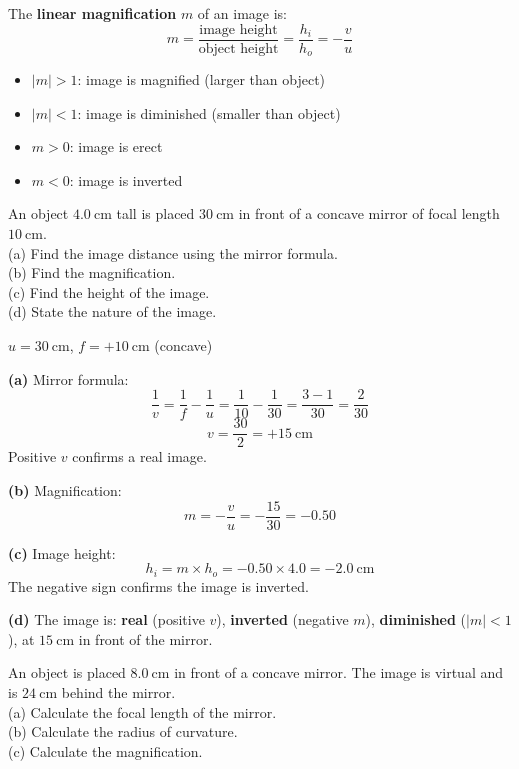 \begin{lawbox}
The \textbf{linear magnification} $m$ of an image
is:
\[
  m = \frac{\text{image height}}{\text{object height}}
  = \frac{h_i}{h_o} = -\frac{v}{u}
\]
\begin{itemize}[noitemsep]
  \item $|m| > 1$: image is magnified (larger than
  object)
  \item $|m| < 1$: image is diminished (smaller
  than object)
  \item $m > 0$: image is erect
  \item $m < 0$: image is inverted
\end{itemize}
\end{lawbox}

\begin{examplebox}[19.1]
An object $4.0\ \text{cm}$ tall is placed
$30\ \text{cm}$ in front of a concave mirror
of focal length $10\ \text{cm}$.\\
(a) Find the image distance using the mirror formula.\\
(b) Find the magnification.\\
(c) Find the height of the image.\\
(d) State the nature of the image.
\end{examplebox}

\begin{solutionbox}
$u = 30\ \text{cm}$, $f = +10\ \text{cm}$ (concave)

\textbf{(a)} Mirror formula:
\[
  \frac{1}{v} = \frac{1}{f} - \frac{1}{u}
  = \frac{1}{10} - \frac{1}{30}
  = \frac{3-1}{30} = \frac{2}{30}
\]
\[
  v = \frac{30}{2} = +15\ \text{cm}
\]
Positive $v$ confirms a real image.

\textbf{(b)} Magnification:
\[
  m = -\frac{v}{u} = -\frac{15}{30} = -0.50
\]

\textbf{(c)} Image height:
\[
  h_i = m \times h_o = -0.50 \times 4.0
  = -2.0\ \text{cm}
\]
The negative sign confirms the image is inverted.

\textbf{(d)} The image is:
\textbf{real} (positive $v$),
\textbf{inverted} (negative $m$),
\textbf{diminished} ($|m| < 1$),
at $15\ \text{cm}$ in front of the mirror.
\end{solutionbox}

\begin{examplebox}[19.2]
An object is placed $8.0\ \text{cm}$ in front of a
concave mirror. The image is virtual and is
$24\ \text{cm}$ behind the mirror.\\
(a) Calculate the focal length of the mirror.\\
(b) Calculate the radius of curvature.\\
(c) Calculate the magnification.
\end{examplebox}

